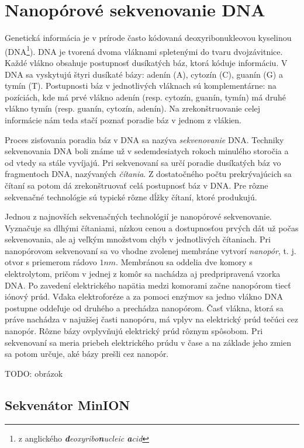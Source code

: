 \chapter{Nanopórové sekvenovanie DNA}

\label{kap:nanoporove_sekvenovanie}

Genetická informácia je v prírode často kódovaná deoxyribonukleovou kyselinou (DNA\footnote{z anglického 
\emph{\textbf{d}eoxyribo\textbf{n}ucleic \textbf{a}cid}}). DNA je tvorená dvoma vláknami spletenými
do tvaru dvojzávitnice. Každé vlákno obsahuje postupnosť dusíkatých báz, ktorá kóduje informáciu. V DNA 
sa 
vyskytujú štyri
dusíkaté bázy: adenín (A), cytozín (C), guanín (G) a tymín (T). Postupnosti báz v jednotlivých vláknach 
sú 
komplementárne: na pozíciách, kde má prvé vlákno adenín 
(resp. cytozín, guanín, tymín) má druhé vlákno tymín (resp. guanín, cytozín, adenín). Na 
zrekonštruovanie 
celej informácie nám teda stačí poznať poradie báz v jednom z vlákien.

Proces zisťovania poradia báz v DNA sa nazýva \emph{sekvenovanie} DNA. Techniky sekvenovania DNA
boli známe už v sedemdesiatych rokoch minulého storočia a od vtedy sa stále vyvíjajú. Pri sekvenovaní
sa určí poradie dusíkatých báz vo fragmentoch DNA, nazývaných \emph{čítania}. Z dostatočného počtu 
prekrývajúcich sa čítaní sa potom dá zrekonštruovať celá postupnosť báz v DNA. Pre rôzne sekvenačné 
technológie sú typické rôzne dĺžky čítaní, ktoré produkujú.

Jednou z najnovších sekvenačných technológií je nanopórové sekvenovanie. Vyznačuje sa dlhými čítaniami,
nízkou cenou a dostupnosťou prvých dát už počas sekvenovania, ale aj veľkým množstvom chýb v 
jednotlivých čítaniach. Pri nanopórovom sekvenovaní sa vo vhodne zvolenej membráne vytvorí 
\emph{nanopór}, t. j. otvor s priemerom rádovo $1 \si{nm}$. Membránou sa oddelia dve komory s 
elektrolytom, pričom v jednej z komôr sa nachádza aj predpripravená vzorka DNA.
Po zavedení elektrického napätia medzi komorami začne nanopórom tiecť iónový prúd. Vďaka elektroforéze a 
za pomoci enzýmov sa jedno vlákno DNA postupne oddeľuje od druhého a prechádza nanopórom. Časť vlákna, 
ktorá sa práve nachádza v najužšej časti nanopóru, má vplyv na elektrický prúd tečúci cez nanopór. Rôzne 
bázy ovplyvňujú elektrický prúd rôznym spôsobom. Pri sekvenovaní sa meria priebeh elektrického prúdu v 
čase a na základe jeho zmien sa potom určuje, aké bázy prešli cez nanopór.

TODO: obrázok

\section{Sekvenátor MinION}

